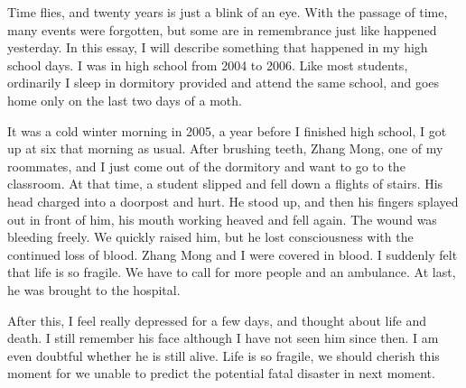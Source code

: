 \documentclass[12pt,a4paper]{caspset}
\begin{document}

Time flies, and twenty years is just a blink of an eye. With the passage of time, many events were forgotten, but some are in remembrance just like happened yesterday. In this essay, I will describe something that happened in my high school days. I was in high school from 2004 to 2006. Like most students, ordinarily I sleep in dormitory provided and attend the same school, and goes home only on the last two days of a moth.

It was a cold winter morning in 2005, a year before I finished high school, I got up at six that morning as usual. After brushing teeth, Zhang Mong, one of my roommates, and I just come out of the dormitory and want to go to the classroom. At that time, a student slipped and fell down a flights of stairs. His head charged into a doorpost and hurt. He stood up, and then his fingers splayed out in front of him, his mouth working heaved and fell again. The wound was bleeding freely. We quickly raised him, but he lost consciousness with the continued loss of blood. Zhang Mong and I were covered in blood. I suddenly felt that life is so fragile. We have to call for more people and an ambulance. At last, he was brought to the hospital. 

After this, I feel really depressed for a few days, and thought about life and death. I still remember his face although I have not seen him since then. I am even doubtful whether he is still alive. Life is so fragile, we should cherish this moment for we unable to predict the potential fatal disaster in next moment.
\end{document}
